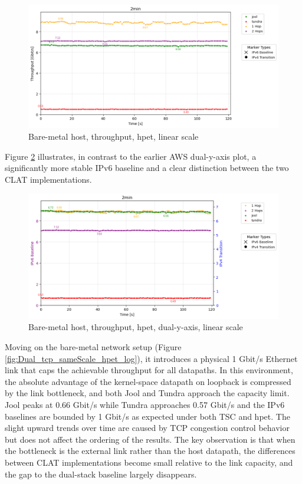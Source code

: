 \begin{figure}[H]
    \centering
    \includegraphics[width=1\textwidth]{resources/finalPlots/combinedplots/SingleLocal_tcp_sameScale_hpet_2min_linear.png}
    \caption{Bare-metal host, throughput, hpet, linear scale}
    \label{fig:Local_tcp_sameScale_hpet_linear}
\end{figure}

Figure \ref{fig:Local_tcp_dualAxis_hpet_linear} illustrates, in contrast to the earlier AWS dual-y-axis plot, a significantly more stable IPv6 baseline and a clear distinction between the two CLAT implementations.

\begin{figure}[H]
    \centering
    \includegraphics[width=1\textwidth]{resources/finalPlots/Jitterplots/LocalSingle_tcp_dualAxis_hpet_2min_linear.png}
    \caption{Bare-metal host, throughput, hpet, dual-y-axis, linear scale}
    \label{fig:Local_tcp_dualAxis_hpet_linear}
\end{figure}



Moving on the bare-metal network setup (Figure \ref{fig:Dual_tcp_sameScale_hpet_log}), it introduces a physical 1 Gbit/s Ethernet link that caps the achievable throughput for all datapaths. In this environment, the absolute advantage of the kernel-space datapath on loopback is compressed by the link bottleneck, and both Jool and Tundra approach the capacity limit. Jool peaks at 0.66 Gbit/s while Tundra approaches 0.57 Gbit/s and the IPv6 baselines are bounded by 1 Gbit/s as expected under both TSC and hpet. The slight upward trends over time are caused by TCP congestion control behavior\cite{rfc5681} but does not affect the ordering of the results. The key observation is that when the bottleneck is the external link rather than the host datapath, the differences between CLAT implementations become small relative to the link capacity, and the gap to the dual-stack baseline largely disappears.


